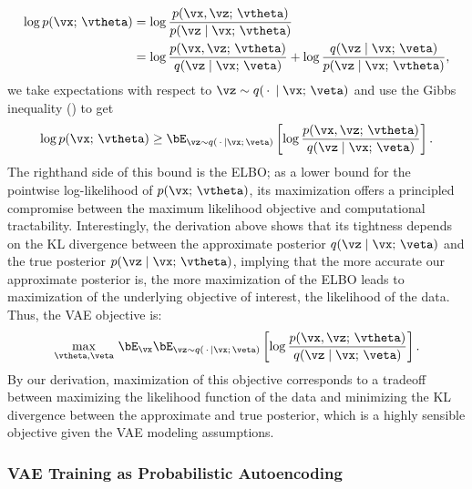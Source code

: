 \documentclass[\toplevelprefix/book-main.tex]{subfiles}
\begin{document}
\begin{align*}
\log p(\vx;\, \vtheta) &=
\log \frac{p(\vx, \vz;\, \vtheta)}{p(\vz \mid \vx;\, \vtheta)}
\\
&=
\log \frac{p(\vx, \vz;\, \vtheta)}{q(\vz \mid \vx;\, \veta)}
+
\log \frac{q(\vz \mid \vx;\, \veta)}{p(\vz \mid \vx;\, \vtheta)},
\end{align*}
we take expectations with respect to $\vz \sim q(\,\cdot\, \mid
\vx;\, \veta)$ and
use the Gibbs inequality () to get
\begin{equation*}
\log p(\vx;\, \vtheta)
\geq
\bE_{\vz \sim q(\,\cdot\, \mid \vx ;\, \veta)} \left[
  \log \frac{p(\vx, \vz;\, \vtheta)}{q(\vz \mid \vx;\, \veta)}
\right].
\end{equation*}
The righthand side of this bound is the ELBO; as a lower bound for the pointwise
log-likelihood of $p(\vx;\, \vtheta)$, its maximization offers a
principled compromise
between the maximum likelihood objective and computational tractability.
Interestingly, the derivation above shows that its tightness depends on the KL
divergence between the approximate posterior $q(\vz \mid \vx;\, \veta)$ and the
true posterior $p(\vz \mid \vx;\, \vtheta)$, implying that the more accurate our
approximate posterior is, the more maximization of the ELBO leads to
maximization of the underlying objective of interest, the likelihood of the
data. Thus, the VAE objective is:
\begin{equation}\label{eq:elbo-objective}
\max_{\vtheta, \veta}\,
\bE_{\vx}
\bE_{\vz \sim q(\,\cdot\, \mid \vx ;\, \veta)} \left[
  \log \frac{p(\vx, \vz;\, \vtheta)}{q(\vz \mid \vx;\, \veta)}
\right].
\end{equation}
By our derivation, maximization of this objective corresponds to a tradeoff
between maximizing the likelihood function of the data and minimizing the KL
divergence between the approximate and true posterior, which is a highly
sensible objective given the VAE modeling assumptions.

\subsubsection{VAE Training as Probabilistic Autoencoding}
\end{document}
